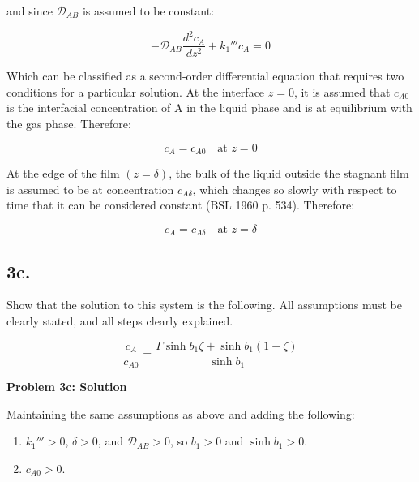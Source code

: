\documentclass[letterpaper,12pt]{article}
\begin{document}
and since $\mathcal{D}_{AB}$ is assumed to be constant:

\begin{equation}
\boxed{
    -\mathcal{D}_{AB}\frac{d^2 c_A}{dz^2} + k_1''' c_A = 0
}
\end{equation}

Which can be classified as a second-order differential equation that requires two conditions for a particular solution. At the interface $z = 0$, it is assumed that $c_{A0}$ is the interfacial concentration of A in the liquid phase and is at equilibrium with the gas phase. Therefore:

\begin{equation}
\boxed{
    c_A = c_{A0} \quad \text{at } z = 0
}
\end{equation}

At the edge of the film $(z = \delta)$, the bulk of the liquid outside the stagnant film is assumed to be at concentration $c_{A \delta}$, which changes so slowly with respect to time that it can be considered constant (BSL 1960 p. 534). Therefore:

\begin{equation}
\boxed{
    c_A = c_{A\delta} \quad \text{at } z = \delta
}
\end{equation}


\subsection*{3c.}
Show that the solution to this system is the following. All assumptions must be
clearly stated, and all steps clearly explained.

\begin{equation*}
\frac{c_A}{c_{A0}}
= \frac{\Gamma \sinh b_1 \zeta + \sinh b_1 (1 - \zeta)}{\sinh b_1}
\end{equation*}

\vspace{6pt}

\textbf{Problem 3c: Solution}

\vspace{6pt}

Maintaining the same assumptions as above and adding the following:

\begin{enumerate}
    \item $k_1''' > 0$, $\delta > 0$, and $\mathcal{D}_{AB} > 0$, so $b_1 > 0$ and $\sinh{b_1} > 0$.
    \item $c_{A0} > 0$.
\end{enumerate}
\end{document}
